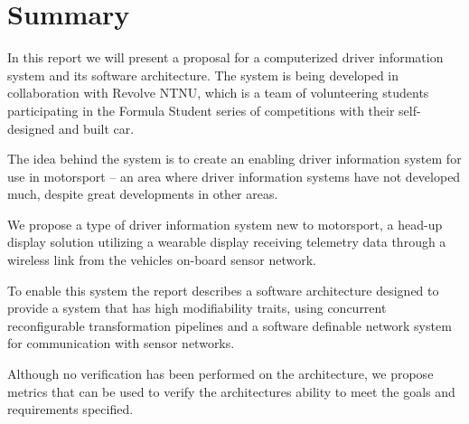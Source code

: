 \section*{Summary}

In this report we will present a proposal for a computerized driver information
system and its software architecture. The system is being developed in
collaboration with Revolve NTNU, which is a team of volunteering students
participating in the Formula Student series of competitions with their
self-designed and built car. 

The idea behind the system is to create an
enabling driver information system for use in motorsport -- an area where
driver information systems have not developed much, despite great developments
in other areas. 

We propose a type of driver information system new to motorsport, a head-up
display solution utilizing a wearable display receiving telemetry data through
a wireless link from the vehicles on-board sensor network. 

To enable this system the report describes a software architecture designed to
provide a system that has high modifiability traits, using concurrent
reconfigurable transformation pipelines and a software definable network
system for communication with sensor networks. 

Although no verification has been performed on the architecture, we propose
metrics that can be used to verify the architectures ability to meet the goals
and requirements specified.

\clearpage
